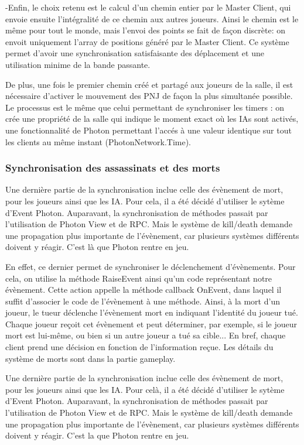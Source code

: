             -Enfin, le choix retenu est le calcul d'un chemin entier par le Master Client, qui envoie ensuite l'intégralité de ce chemin aux autres joueurs.
            Ainsi le chemin est le même pour tout le monde, mais l'envoi des points se fait de façon discrète: on envoit uniquement l'array de positions généré
            par le Master Client. Ce système permet d'avoir une synchronisation satisfaisante des déplacement et une utilisation minime de la bande passante.

        De plus, une fois le premier chemin créé et partagé aux joueurs de la salle, il est nécessaire d'activer le mouvement des PNJ de façon la plus simultanée possible.
        Le processus est le même que celui permettant de synchroniser les timers : on crée une propriété de la salle qui indique le moment exact où
        les IAs sont activés, une fonctionnalité de Photon permettant l'accés à une valeur identique sur tout les clients au même instant (PhotonNetwork.Time).

    \subsubsection{Synchronisation des assassinats et des morts}

        Une dernière partie de la synchronisation inclue celle des évènement de mort, pour les joueurs ainsi
        que les IA. Pour cela, il a été décidé d'utiliser le sytème d'Event Photon. Auparavant, la synchronisation de méthodes
        passait par l'utilisation de Photon View et de RPC. Mais le système de kill/death demande une propagation plus importante
        de l'évènement, car plusieurs systèmes différents doivent y réagir. C'est là que Photon rentre en jeu.

        En effet, ce dernier permet de synchroniser le déclenchement d'évènements. Pour cela, on utilise la méthode RaiseEvent ainsi
        qu'un code représentant notre évènement. Cette action appelle la méthode callback OnEvent, dans laquel il suffit d'associer le
        code de l'évènement à une méthode. Ainsi, à la mort d'un joueur, le tueur déclenche l'évènement mort en indiquant l'identité du
        joueur tué. Chaque joueur reçoit cet évènement et peut déterminer, par exemple, si le joueur mort est lui-même, ou bien si un
        autre joueur a tué sa cible... En bref, chaque client prend une décision en fonction de l'information reçue.
        Les détails du système de morts sont dans la partie gameplay.

        Une dernière partie de la synchronisation inclue celle des évènement de mort, pour les joueurs ainsi
        que les IA. Pour celà, il a été décidé d'utiliser le sytème d'Event Photon. Auparavant, la synchronisation de méthodes
        passait par l'utilisation de Photon View et de RPC. Mais le système de kill/death demande une propagation plus importante
        de l'évènement, car plusieurs systèmes différents doivent y réagir. C'est la que Photon rentre en jeu.

